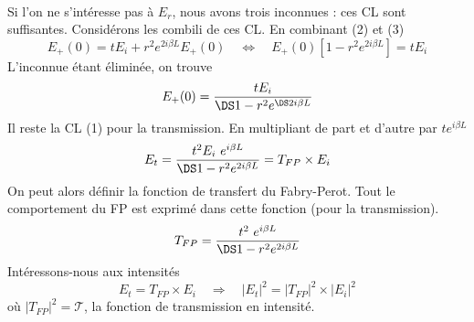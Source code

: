 \ \\

Si l'on ne s'intéresse pas à $E_r$, nous avons trois inconnues : ces CL sont suffisantes. 
Considérons les combili de ces CL. En combinant (2) et (3)
\begin{equation}
E_+(0) = tE_i+r^2e^{2i\beta L}E_+(0)\quad\Leftrightarrow\quad E_+(0)[1-r^2e^{2i\beta L}] = tE_i
\end{equation}
L'inconnue étant éliminée, on trouve
\begin{equation}
E_+(0) = \dfrac{tE_i}{\DS 1-r^2e^{\DS 2i\beta L}}
\end{equation}
Il reste la CL (1) pour la transmission. En multipliant de part et d'autre par $te^{i\beta L}$
\begin{equation}
E_t = \dfrac{t^2E_i\ e^{i\beta L}}{\DS 1-r^2e^{2i\beta L}} = T_{FP}\times E_i
\end{equation}
On peut alors définir la fonction de transfert du Fabry-Perot. Tout le comportement du FP est 
exprimé dans cette fonction (pour la transmission).
\begin{equation}
T_{FP} = \dfrac{t^2\ e^{i\beta L}}{\DS 1-r^2e^{2i\beta L}}
\end{equation}
Intéressons-nous aux intensités
\begin{equation}
E_t = T_{FP}\times E_i\quad\Rightarrow\quad |E_t|^2 = |T_{FP}|^2 \times |E_i|^2
\end{equation}
où $|T_{FP}|^2 = \mathcal{T}$, la fonction de transmission en intensité.\\

